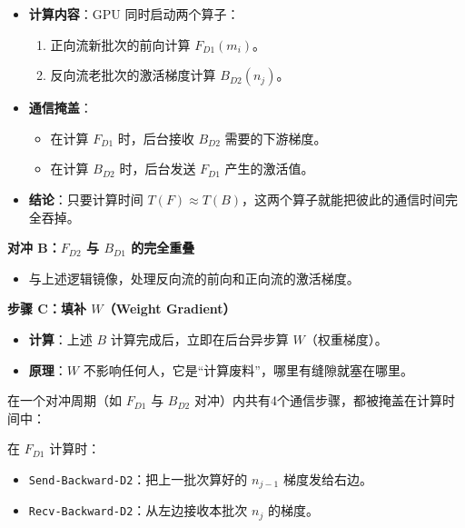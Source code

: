 \begin{itemize}
\tightlist
\item
  \textbf{计算内容}：GPU 同时启动两个算子：

  \begin{enumerate}
  \def\labelenumi{\arabic{enumi}.}
  \tightlist
  \item
    正向流新批次的前向计算 \(F_{D1}(m_i)\)。
  \item
    反向流老批次的激活梯度计算 \(B_{D2}(n_j)\)。
  \end{enumerate}
\item
  \textbf{通信掩盖}：

  \begin{itemize}
  \tightlist
  \item
    在计算 \(F_{D1}\) 时，后台接收 \(B_{D2}\) 需要的下游梯度。
  \item
    在计算 \(B_{D2}\) 时，后台发送 \(F_{D1}\) 产生的激活值。
  \end{itemize}
\item
  \textbf{结论}：只要计算时间 \(T(F) \approx T(B)\)，这两个算子就能把彼此的通信时间完全吞掉。
\end{itemize}

\textbf{对冲 B：\(F_{D2}\) 与 \(B_{D1}\) 的完全重叠}

\begin{itemize}
\tightlist
\item
  与上述逻辑镜像，处理反向流的前向和正向流的激活梯度。
\end{itemize}

\textbf{步骤 C：填补 \(W\)（Weight Gradient）}

\begin{itemize}
\tightlist
\item
  \textbf{计算}：上述 \(B\) 计算完成后，立即在后台异步算 \(W\)（权重梯度）。
\item
  \textbf{原理}：\(W\) 不影响任何人，它是``计算废料''，哪里有缝隙就塞在哪里。
\end{itemize}

在一个对冲周期（如 \(F_{D1}\) 与 \(B_{D2}\) 对冲）内共有4个通信步骤，都被掩盖在计算时间中：

在 \(F_{D1}\) 计算时：

\begin{itemize}
\item
  \texttt{Send-Backward-D2}：把上一批次算好的 \(n_{j-1}\) 梯度发给右边。
\item
  \texttt{Recv-Backward-D2}：从左边接收本批次 \(n_j\) 的梯度。
\end{itemize}

